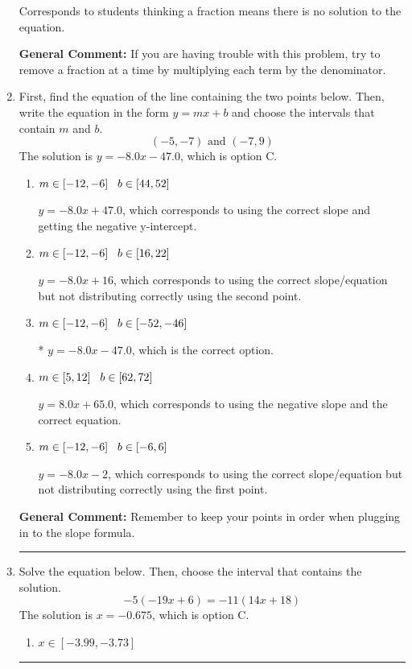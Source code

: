 \documentclass{extbook}[14pt]
\newcommand{\litem}[1]{\item #1

\rule{\textwidth}{0.4pt}}
\begin{document}
\begin{enumerate}
{\begin{enumerate}[label=\Alph*.]
Corresponds to students thinking a fraction means there is no solution to the equation.
\end{enumerate}

\textbf{General Comment:} If you are having trouble with this problem, try to remove a fraction at a time by multiplying each term by the denominator.
}
\litem{
First, find the equation of the line containing the two points below. Then, write the equation in the form $ y=mx+b $ and choose the intervals that contain $m$ and $b$.
\[ (-5, -7) \text{ and } (-7, 9) \]The solution is \( y = -8.0x -47.0 \), which is option C.\begin{enumerate}[label=\Alph*.]
\item \( m \in [-12, -6] \hspace*{3mm} b \in [44, 52] \)

 $y = -8.0x + 47.0$, which corresponds to using the correct slope and getting the negative y-intercept.
\item \( m \in [-12, -6] \hspace*{3mm} b \in [16, 22] \)

 $y = -8.0x + 16$, which corresponds to using the correct slope/equation but not distributing correctly using the second point.
\item \( m \in [-12, -6] \hspace*{3mm} b \in [-52, -46] \)

* $y = -8.0x -47.0$, which is the correct option.
\item \( m \in [5, 12] \hspace*{3mm} b \in [62, 72] \)

 $y = 8.0x + 65.0$, which corresponds to using the negative slope and the correct equation.
\item \( m \in [-12, -6] \hspace*{3mm} b \in [-6, 6] \)

 $y = -8.0x -2$, which corresponds to using the correct slope/equation but not distributing correctly using the first point.
\end{enumerate}

\textbf{General Comment:} Remember to keep your points in order when plugging in to the slope formula.
}
\litem{
Solve the equation below. Then, choose the interval that contains the solution.
\[ -5(-19x + 6) = -11(14x + 18) \]The solution is \( x = -0.675 \), which is option C.\begin{enumerate}[label=\Alph*.]
\item \( x \in [-3.99, -3.73] \)


\end{enumerate}}
\end{enumerate}
\end{document}
